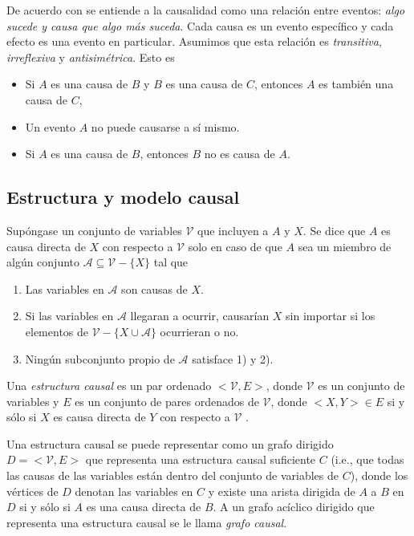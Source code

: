 De acuerdo con \cite{spirtes2000causation} se entiende a la causalidad 
como una relación entre eventos: \textit{algo sucede y causa que algo más suceda}. Cada causa es un evento específico y cada efecto es una evento
en particular. Asumimos que esta relación es \textit{transitiva}, \textit{irreflexiva} y \textit{antisimétrica}. Esto es 
\begin{itemize}
    \item Si $A$ es una causa de $B$ y $B$ es una causa de $C$, entonces
    $A$ es también una causa de $C$,
    \item Un evento $A$ no puede causarse a sí mismo.
    \item Si $A$ es una causa de $B$, entonces $B$ no es causa de $A$.
\end{itemize}

\subsection{Estructura y modelo causal}

Supóngase un conjunto de variables $\mathcal{V}$ que incluyen a $A$ y $X$. 
Se dice que $A$ es causa directa de $X$ con respecto a $\mathcal{V}$
solo en caso de que $A$ sea un miembro de algún conjunto 
$\mathcal{A} \subseteq \mathcal{V} - \{X\}$ tal que 

\begin{enumerate}
    \item Las variables en $\mathcal{A}$ son causas de $X$.
    \item Si las variables en $\mathcal{A}$ llegaran a ocurrir,
    causarían $X$ sin importar si los elementos de $\mathcal{V} - \{X \cup \mathcal{A}\}$ ocurrieran o no.
    \item Ningún subconjunto propio de $\mathcal{A}$ satisface
    1) y 2).
\end{enumerate}

Una \textit{estructura causal} es un par ordenado $<\mathcal{V}, E>$, donde
$\mathcal{V}$ es un conjunto de variables y $E$ es un conjunto
de pares ordenados de $\mathcal{V}$, donde $<X, Y> \in E$ si
y sólo si $X$ es causa directa de $Y$ con respecto a  
$\mathcal{V}$ \cite{spirtes2000causation}.

Una estructura causal se puede representar como un grafo
dirigido $D = <\mathcal{V},E>$ que representa una estructura causal suficiente $C$ (i.e., que todas las causas de las variables están dentro del conjunto de variables de $C$), donde los vértices de $D$ denotan las variables en $C$ y existe una
arista dirigida de $A$ a $B$ en $D$ si y sólo si $A$ es
una causa directa de $B$.
A un grafo acíclico dirigido que representa una estructura causal se le llama \textit{grafo causal}.

